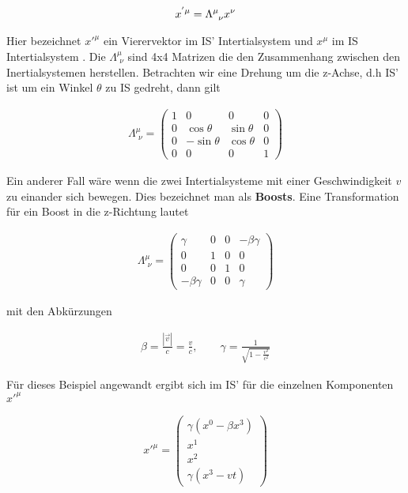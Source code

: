 \begin{align}
  \label{eq:11}
  x^{'\mu}=\Lambda^\mu_{\hphantom\mu \nu}x^\nu
\end{align}

Hier bezeichnet \(x'^\mu\) ein Vierervektor im IS' Intertialsystem und \(x^\mu\) im IS Intertialsystem . Die \(\Lambda^\mu_{\,\, \nu}\) sind 4x4 Matrizen die den Zusammenhang zwischen den Inertialsystemen herstellen. Betrachten wir eine Drehung um die z-Achse, d.h IS' ist um ein Winkel \(\theta\) zu IS gedreht, dann gilt

\begin{align}
  \label{eq:12}
  \Lambda^\mu_{\,\, \nu} =
  \begin{pmatrix}
    1&0&0&0\\
0&\cos\theta&\sin\theta&0\\
0&-\sin\theta&\cos\theta&0\\
    0&0&0&1
  \end{pmatrix}
\end{align}

Ein anderer Fall wäre wenn die zwei Intertialsysteme mit einer Geschwindigkeit \(v\) zu einander sich bewegen. Dies bezeichnet man als \textbf{Boosts}. Eine Transformation für ein Boost in die z-Richtung lautet

\begin{align}
  \label{eq:13}
  \Lambda^\mu_{\,\, \nu} =
  \begin{pmatrix}
    \gamma&0&0&-\beta\gamma\\
0&1&0&0\\
0&0&1&0\\
    -\beta\gamma&0&0&\gamma
  \end{pmatrix}
\end{align}

mit den Abkürzungen

\begin{align}
  \label{eq:14}
  \beta =\frac{|\vec v|}{c}= \frac{v}{c} ,\qquad \gamma = \frac{1}{\sqrt{1-\frac{v^2}{c^2}}}
\end{align}


Für dieses Beispiel angewandt ergibt sich im IS' für die einzelnen Komponenten \(x'^\mu\)

\begin{align}
  \label{eq:15}
  x'^\mu =
  \begin{pmatrix}
     \gamma(x^0-\beta x^3)\\
     x^1\\
     x^2\\
 \gamma(x^3-vt)
  \end{pmatrix}
\end{align}

